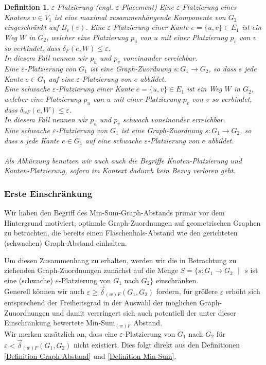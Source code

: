\documentclass[a4paper, 12pt, twoside]{article}
\theoremstyle{Format1} %
\newtheorem{Def}{Definition}[section]       %
\begin{document}
\begin{Def}
	$\varepsilon$-Platzierung (engl. $\varepsilon$-Placement)
	Eine \textit{$\varepsilon$-Platzierung eines Knotens $v \in V_1$} ist eine maximal zusammenhängende Komponente von $G_2$ eingeschränkt auf $B_{\varepsilon}(v)$.
	Eine \textit{$\varepsilon$-Platzierung einer Kante $e = \{u,v\} \in E_1$} ist ein Weg $W$ in $G_2$, welcher eine Platzierung $p_u$ von $u$ mit einer Platzierung $p_v$ von $v$
	so verbindet, dass $\delta_F(e, W) \leq \varepsilon$.
	\\
	In diesem Fall nennen wir $p_u$ und $p_v$ \textit{voneinander erreichbar}.
	\\
	Eine \textit{$\varepsilon$-Platzierung von $G_1$} ist eine Graph-Zuordnung $s: G_1 \to G_2$, so dass $s$ jede Kante $e \in G_1$ auf eine $\varepsilon$-Platzierung von $e$ abbildet.
	\\
	Eine schwache $\varepsilon$-Platzierung einer Kante $e = \{u,v\} \in E_1$ ist ein Weg $W$ in $G_2$, welcher eine Platzierung $p_u$ von $u$ mit einer Platzierung $p_v$ von $v$
	so verbindet, dass $\delta_{wF}(e, W) \leq \varepsilon$.
	\\
	In diesem Fall nennen wir $p_u$ und $p_v$ \textit{schwach voneinander erreichbar}.
	\\
	Eine schwache \textit{$\varepsilon$-Platzierung von $G_1$} ist eine Graph-Zuordnung $s: G_1 \to G_2$, so dass $s$ jede Kante $e \in G_1$ auf eine schwache $\varepsilon$-Platzierung von $e$ abbildet.
	\\
	\\
	Als Abkürzung benutzen wir auch auch die Begriffe \textit{Knoten-Platzierung} und \textit{Kanten-Platzierung}, sofern im Kontext dadurch kein Bezug verloren geht.
\end{Def}

\subsubsection{Erste Einschränkung}

Wir haben den Begriff des Min-Sum-Graph-Abstands primär vor dem Hintergrund motiviert, optimale Graph-Zuordnungen auf geometrischen Graphen zu betrachten,
die bereits einen Flaschenhals-Abstand wie den gerichteten (schwachen) Graph-Abstand einhalten.

Um diesen Zusammenhang zu erhalten, werden wir die in Betrachtung zu ziehenden Graph-Zuordnungen zunächst auf die Menge
$S = \{s: G_1 \to G_2 \text{ $|$ } s$ ist eine (schwache) $\varepsilon$-Platzierung von $G_1$ nach $G_2\}$ einschränken.
\\
Generell können wir auch $\varepsilon \geq \vec{\delta}_{(w)F}(G_1, G_2)$ fordern, für größere $\varepsilon$ erhöht sich entsprechend der Freiheitsgrad in der Auswahl
der möglichen Graph-Zuuordnungen und damit verrringert sich auch potentiell der unter dieser Einschränkung bewertete Min-Sum$_{(w)F}$ Abstand.
\\
Wir merken zusätzlich an, dass eine $\varepsilon$-Platzierung von $G_1$ nach $G_2$ für $\varepsilon < \vec{\delta}_{(w)F}(G_1,G_2)$
nicht existiert. Dies folgt direkt aus den Definitionen \ref{Definition Graph-Abstand} und \ref{Definition Min-Sum}.
\end{document}
